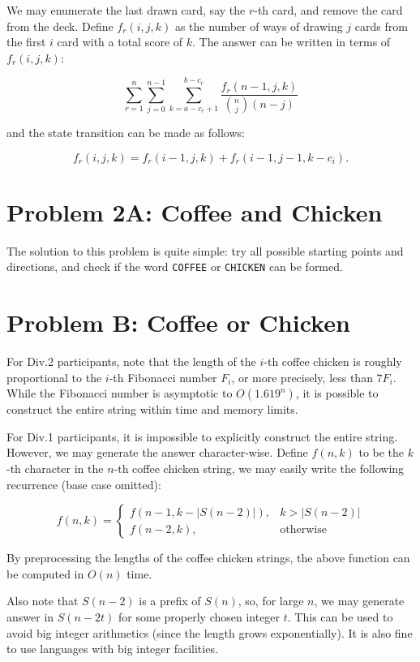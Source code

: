 \documentclass[a4paper,10.5pt,twoside]{article}
\begin{document}
We may enumerate the last drawn card, say the $r$-th card, and remove the card from the deck. Define $f_r(i, j, k)$ as the number of ways of drawing $j$ cards from the first $i$ card with a total score of $k$. The answer can be written in terms of $f_r(i, j, k)$:

$$ \sum_{r = 1}^n \sum_{j=0}^{n-1} \sum_{k = a-c_r+1}^{b-c_r} \frac{f_r(n-1, j, k)}{\binom{n}{j} (n-j)} $$

and the state transition can be made as follows:

$$ f_r(i, j, k) = f_r(i-1, j, k) + f_r(i-1, j-1, k-c_i). $$

\section*{Problem 2A: Coffee and Chicken}
The solution to this problem is quite simple: try all possible starting points and directions, and check if the word \texttt{COFFEE} or \texttt{CHICKEN} can be formed.

\section*{Problem B: Coffee or Chicken}
For Div.2 participants, note that the length of the $i$-th coffee chicken is roughly proportional to the $i$-th Fibonacci number $F_i$, or more precisely, less than $7F_i$. While the Fibonacci number is asymptotic to $O(1.619^n)$, it is possible to construct the entire string within time and memory limits.

For Div.1 participants, it is impossible to explicitly construct the entire string. However, we may generate the answer character-wise. Define $f(n, k)$ to be the $k$-th character in the $n$-th coffee chicken string, we may easily write the following recurrence (base case omitted):

$$
f(n, k) = \begin{cases}
	f(n-1, k-|S(n-2)|), & k > |S(n-2)| \\
	f(n-2, k), & \text{otherwise}
\end{cases}
$$

By preprocessing the lengths of the coffee chicken strings, the above function can be computed in $O(n)$ time.

Also note that $S(n-2)$ is a prefix of $S(n)$, so, for large $n$, we may generate answer in $S(n-2t)$ for some properly chosen integer $t$. This can be used to avoid big integer arithmetics (since the length grows exponentially). It is also fine to use languages with big integer facilities.
\end{document}
